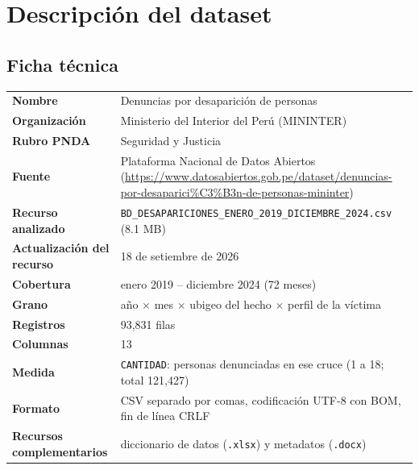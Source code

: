 \section{Descripci\'on del dataset}

\subsection{Ficha t\'ecnica}

\begin{center}
\begin{tabular}{p{4.2cm}p{10.5cm}}
\toprule
\textbf{Nombre} & Denuncias por desaparici\'on de personas \\
\textbf{Organizaci\'on} & Ministerio del Interior del Per\'u (MININTER) \\
\textbf{Rubro PNDA} & Seguridad y Justicia \\
\textbf{Fuente} & Plataforma Nacional de Datos Abiertos
  (\url{https://www.datosabiertos.gob.pe/dataset/denuncias-por-desaparici\%C3\%B3n-de-personas-mininter}) \\
\textbf{Recurso analizado} & \texttt{BD\_DESAPARICIONES\_ENERO\_2019\_DICIEMBRE\_2024.csv} (8.1 MB) \\
\textbf{Actualizaci\'on del recurso} & 18 de setiembre de 2026 \\
\textbf{Cobertura} & enero 2019 -- diciembre 2024 (72 meses) \\
\textbf{Grano} & a\~no $\times$ mes $\times$ ubigeo del hecho $\times$ perfil de la v\'ictima \\
\textbf{Registros} & 93,831 filas \\
\textbf{Columnas} & 13 \\
\textbf{Medida} & \texttt{CANTIDAD}: personas denunciadas en ese cruce (1 a 18; total 121,427) \\
\textbf{Formato} & CSV separado por comas, codificaci\'on UTF-8 con BOM, fin de l\'inea CRLF \\
\textbf{Recursos complementarios} & diccionario de datos (\texttt{.xlsx}) y metadatos (\texttt{.docx}) \\
\bottomrule
\end{tabular}
\end{center}

